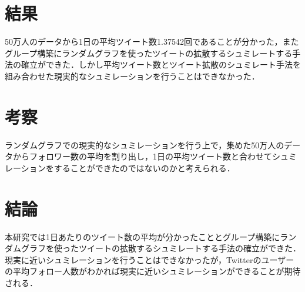 \documentclass[uplatex,twocolumn,dvipdfmx]{jsarticle}
\begin{document}
\section{結果}

50万人のデータから1日の平均ツイート数1.37542回であることが分かった，またグループ構築にランダムグラフを使ったツイートの拡散するシュミレートする手法の確立ができた．しかし平均ツイート数とツイート拡散のシュミレート手法を組み合わせた現実的なシュミレーションを行うことはできなかった．


\section{考察}

ランダムグラフでの現実的なシュミレーションを行う上で，集めた50万人のデータからフォロワー数の平均を割り出し，1日の平均ツイート数と合わせてシュミレーションをすることができたのではないのかと考えられる．

\section{結論}

本研究では1日あたりのツイート数の平均が分かったこととグループ構築にランダムグラフを使ったツイートの拡散するシュミレートする手法の確立ができた．現実に近いシュミレーションを行うことはできなかったが，Twitterのユーザーの平均フォロー人数がわかれば現実に近いシュミレーションができることが期待される．


\end{document}
